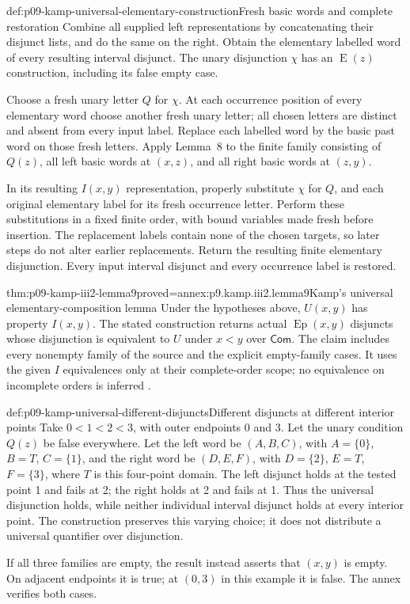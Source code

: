 \begin{hbmethod}{def:p09-kamp-universal-elementary-construction}{Fresh basic words and complete restoration}
Combine all supplied left representations by concatenating their disjunct
lists, and do the same on the right. Obtain the elementary labelled word
of every resulting interval disjunct. The unary disjunction \(\chi\)
has an \(\operatorname{E}(z)\) construction, including its false
empty case.

Choose a fresh unary letter \(Q\) for \(\chi\). At each
occurrence position of every elementary word choose another fresh unary
letter; all chosen letters are distinct and absent from every input
label. Replace each labelled word by the basic past word on those fresh
letters. Apply Lemma~8 to the finite family consisting of \(Q(z)\),
all left basic words at \((x,z)\), and all right basic words at
\((z,y)\).

In its resulting \(I(x,y)\) representation, properly substitute
\(\chi\) for \(Q\), and each original elementary label for its
fresh occurrence letter. Perform these substitutions in a fixed finite
order, with bound variables made fresh before insertion. The replacement
labels contain none of the chosen targets, so later steps do not alter
earlier replacements. Return the resulting finite elementary disjunction.
Every input interval disjunct and every occurrence label is restored.
\end{hbmethod}

\begin{hblemma}{thm:p09-kamp-iii2-lemma9}{proved=annex:p9.kamp.iii2.lemma9}{Kamp's universal elementary-composition lemma}
Under the hypotheses above, \(U(x,y)\) has property \(I(x,y)\).
The stated construction returns actual
\(\operatorname{Ep}(x,y)\) disjuncts whose disjunction is equivalent
to \(U\) under \(x<y\) over \(\mathsf{Com}\).
The claim includes every nonempty family of the source and the explicit
empty-family cases. It uses the given \(I\) equivalences only at
their complete-order scope; no equivalence on incomplete orders is inferred
\cite[ch.~III, lemma~9, pp.~92--93]{Kamp1968}.
\end{hblemma}

\begin{hbexample}{def:p09-kamp-universal-different-disjuncts}{Different disjuncts at different interior points}
Take \(0<1<2<3\), with outer endpoints 0 and 3. Let the unary
condition \(Q(z)\) be false everywhere. Let the left word be
\((A,B,C)\), with \(A=\{0\}\), \(B=T\), \(C=\{1\}\),
and the right word be \((D,E,F)\), with
\(D=\{2\}\), \(E=T\), \(F=\{3\}\), where \(T\)
is this four-point domain. The left disjunct holds at the tested point
1 and fails at 2; the right holds at 2 and fails at 1. Thus the
universal disjunction holds, while neither individual interval disjunct
holds at every interior point. The construction preserves this varying
choice; it does not distribute a universal quantifier over disjunction.

If all three families are empty, the result instead asserts that
\((x,y)\) is empty. On adjacent endpoints it is true; at \((0,3)\)
in this example it is false. The annex verifies both cases.
\end{hbexample}
